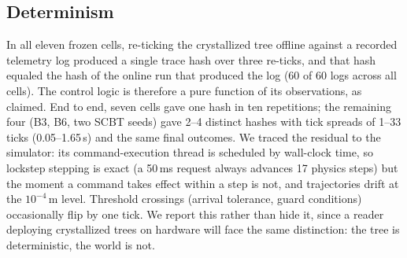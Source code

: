 \documentclass[conference]{IEEEtran}
\begin{document}
\subsection{Determinism}
In all eleven frozen cells, re-ticking the crystallized tree offline against a recorded telemetry log produced a single trace hash over three re-ticks, and that hash equaled the hash of the online run that produced the log (60 of 60 logs across all cells). The control logic is therefore a pure function of its observations, as claimed. End to end, seven cells gave one hash in ten repetitions; the remaining four (B3, B6, two SCBT seeds) gave 2--4 distinct hashes with tick spreads of 1--33 ticks (0.05--1.65\,s) and the same final outcomes. We traced the residual to the simulator: its command-execution thread is scheduled by wall-clock time, so lockstep stepping is exact (a 50\,ms request always advances 17 physics steps) but the moment a command takes effect within a step is not, and trajectories drift at the $10^{-4}$\,m level. Threshold crossings (arrival tolerance, guard conditions) occasionally flip by one tick. We report this rather than hide it, since a reader deploying crystallized trees on hardware will face the same distinction: the tree is deterministic, the world is not.
\end{document}
